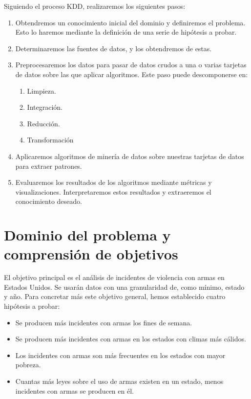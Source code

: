\documentclass[11pt,a4paper]{article}
\begin{document}
Siguiendo el proceso KDD, realizaremos los siguientes pasos:

\begin{enumerate}
    \item Obtendremos un conocimiento inicial del dominio y definiremos el problema. Esto lo haremos mediante la definición de una serie de hipótesis a probar.
    \item Determinaremos las fuentes de datos, y los obtendremos de estas.
    \item Preprocesaremos los datos para pasar de datos crudos a una o varias tarjetas de datos sobre las que aplicar algoritmos. Este paso puede descomponerse en:
    \begin{enumerate}
        \item Limpieza.
        \item Integración.
        \item Reducción.
        \item Transformación
    \end{enumerate}
    \item Aplicaremos algoritmos de minería de datos sobre nuestras tarjetas de datos para extraer patrones.
    \item Evaluaremos los resultados de los algoritmos mediante métricas y visualizaciones. Interpretaremos estos resultados y extraeremos el conocimiento deseado.
\end{enumerate}

\section{Dominio del problema y comprensión de objetivos}

El objetivo principal es el análisis de incidentes de violencia con armas en Estados Unidos. Se usarán datos con una granularidad de, como mínimo, estado y año. Para concretar más este objetivo general, hemos establecido cuatro hipótesis a probar:

\begin{itemize}
    \item Se producen más incidentes con armas los fines de semana.
    \item Se producen más incidentes con armas en los estados con climas más cálidos.
    \item Los incidentes con armas son más frecuentes en los estados con mayor pobreza.
    \item Cuantas más leyes sobre el uso de armas existen en un estado, menos incidentes con armas se producen en él.
\end{itemize}
\end{document}
